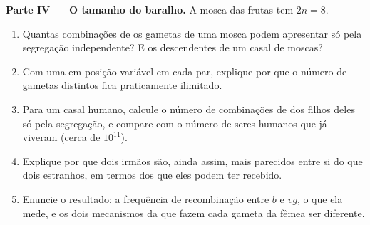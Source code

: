 \begin{problem}
\medskip
\noindent\textbf{Parte IV --- O tamanho do baralho.}
A mosca-das-frutas tem $2n = 8$.
\begin{enumerate}[resume]
  \item Quantas combinações de  os gametas de uma mosca
        podem apresentar só pela segregação independente? E os
        descendentes de um casal de moscas?
  \item Com uma  em posição variável em cada par, explique
        por que o número de gametas distintos fica praticamente
        ilimitado.
  \item Para um casal humano, calcule o número de combinações de
         dos filhos deles só pela segregação, e compare com
        o número de seres humanos que já viveram (cerca de $10^{11}$).
  \item Explique por que dois irmãos são, ainda assim, mais parecidos
        entre si do que dois estranhos, em termos dos  que eles
        podem ter recebido.
  \item Enuncie o resultado: a frequência de recombinação entre $b$ e
        $vg$, o que ela mede, e os dois mecanismos da  que fazem
        cada gameta da fêmea ser diferente.
\end{enumerate}
\end{problem}

